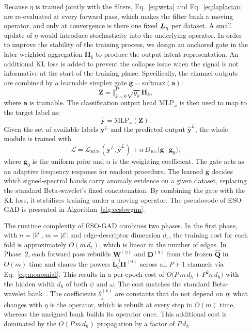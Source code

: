 Because $\eta$ is trained jointly with the filters, Eq.~\eqref{eq:weta} and Eq.~\eqref{eq:laplacian} are re-evaluated at every forward pass, which makes the filter bank a moving operator, and only at convergence is there one fixed $\bm{L}_{\eta}$ per dataset.
A small update of $\eta$ would introduce stochasticity into the underlying operator.
In order to improve the stability of the training process, we design an anchored gate in the later weighted aggregation $\bm H_k$ to produce the output latent representation.
An additional KL loss is added to prevent the collapse issue when the signal is not informative at the start of the training phase.
Specifically, the channel outputs are combined by a learnable simplex gate $\bm{g}=\mathrm{softmax}(\bm{a})$:
\begin{equation}
\bm{Z}=\big\Vert_{k=0}^{P}\sqrt{g_k}\,\bm{H}_k,
\label{eq:gate}
\end{equation}
 where $\bm{a}$ is trainable.
The classification output head $\text{MLP}_\omega$ is then used to map to the target label as:
\begin{equation}
\hat{\bm{y}}= \text{MLP}_\omega(\bm{Z}).
\end{equation}
Given the set of available labels $\bm{y}^L$ and the predicted output $\hat{\bm{y}}^L$, the whole module is  trained with
\begin{equation}
\mathcal{L}
=\mathcal{L}_{\mathrm{BCE}}(\bm{y}^L,\hat{\bm{y}}^L)
+\alpha\, D_{\mathrm{KL}}\!\bigl(\bm{g}\,\Vert\,\bm{g}_0\bigr),
\label{eq:loss}
\end{equation}
where $\bm{g}_0$ is the uniform prior and $\alpha$ is the weighting coefficient.
The gate acts as an adaptive frequency response for readout procedure.
The learned $\bm{g}$ decides which signed-spectral bands carry anomaly evidence on a given dataset, replacing the standard Beta-wavelet's fixed concatenation.
By combining the gate with the KL loss, it stabilizes training under a moving operator.
The pseudocode of ESO-GAD is presented in Algorithm~\ref{alg:ecsbwgnn}.

The runtime complexity of ESO-GAD combines two phases.
In the first phase, with $n=|\mathcal V|$, $m=|\mathcal E|$ and edge-descriptor dimension $d_e$, the training cost for each fold is approximately $O(m\,d_e)$, which is linear in the number of edges.
In Phase~2, each forward pass rebuilds $\bm W^{(\eta)}$ and
$\bm D^{(\eta)}$ from the frozen $\hat{\bm Q}$ in $O(m)$ time and shares the powers $\bm L_\eta^{\,j}\bm H^{(0)}$ across all $P{+}1$ channels via Eq.~\eqref{eq:monomial}.
This results in a per-epoch cost of
$O\bigl(P\,m\,d_h+P^{2}n\,d_h\bigr)$ with the hidden width $d_h$ of both $\psi$ and $\omega$.
The cost matches the standard Beta-wavelet bank~\citep{BWGNN}.
The coefficients $\theta^{(k)}_j$ are constants that do not depend on $\eta$; what changes with $\eta$ is the operator, which is rebuilt at every step in $O(m)$ time, whereas the unsigned bank builds its operator once. This additional cost is dominated by the $O(P\,m\,d_h)$ propagation by a factor of $P\,d_h$.
